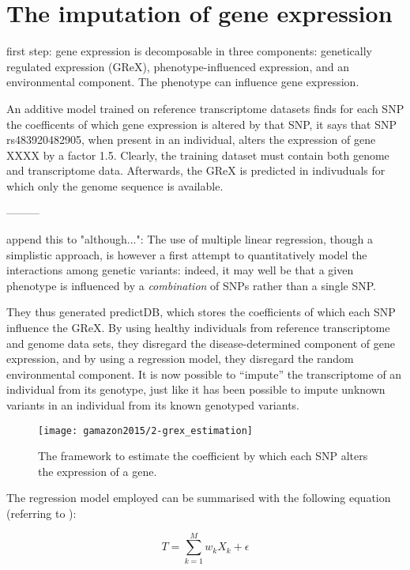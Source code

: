 \documentclass[../main.tex]{subfiles}
\begin{document}
\section{The imputation of gene expression}

first step: gene expression is decomposable in three components: genetically
regulated expression (GReX), phenotype-influenced expression, and an
environmental component. The phenotype can influence gene expression.

An additive model trained on reference transcriptome datasets finds for each
SNP the coefficents of which gene expression is altered by that SNP, \ie 
it
says that SNP rs483920482905, when present in an individual, alters the
expression of gene XXXX by a factor 1.5. Clearly, the training dataset must
contain both genome and transcriptome data. Afterwards, the GReX is predicted
in indivuduals for which only the genome sequence is available.

---------

append this to "although...": The use of multiple linear regression, 
though a simplistic approach, is however a first attempt to 
quantitatively model the interactions among genetic variants: indeed, it 
may well be that a given phenotype is influenced by a 
\textit{combination} of SNPs rather than a single SNP.

They thus generated predictDB, which stores the coefficients of which 
each SNP influence the GReX. By using healthy individuals from reference 
transcriptome and genome data sets, they disregard the 
disease-determined component of gene expression, and by using a 
regression model, they disregard the random environmental component. It 
is now possible to \enquote{impute} the transcriptome of an individual 
from its genotype, just like it has been possible to impute unknown 
variants in an individual from its known genotyped variants.

\begin{figure}
	\texttt{[image: gamazon2015/2-grex\_estimation]}
	\caption{The framework to estimate the coefficient by which each SNP 
		alters the expression of a gene.}
\end{figure}

The regression model employed can be summarised with the following 
equation (referring to ):

\begin{equation}
	T = \sum_{k=1}^{M}{w_k X_k + \epsilon}
\end{equation}
\end{document}
